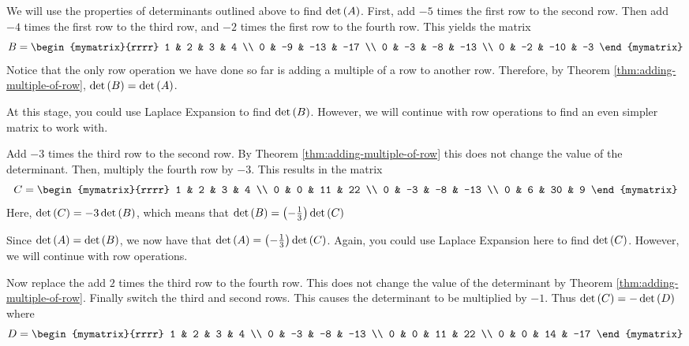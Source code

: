 \begin{solution}
We will use the properties of determinants outlined above to find $\det \left(A\right)$. First, add $-5$ times the first row to the second row. Then add $-4$ times the first row to the third row, and $-2$ times
the first row to the fourth row. This yields the matrix
\begin{equation*}
B=\begin{mymatrix}{rrrr}
1 & 2 & 3 & 4 \\
0 & -9 & -13 & -17 \\
0 & -3 & -8 & -13 \\
0 & -2 & -10 & -3
\end{mymatrix}
\end{equation*}
Notice that the only row operation we have done so far is adding a multiple 
of a row to another row. Therefore, by Theorem \ref{thm:adding-multiple-of-row}, $\det \left(B\right) = \det \left(A\right)$. 

At this stage, you could use Laplace Expansion to find $\det \left(B\right)$. However, we will continue with row operations 
to find an even simpler matrix to work with.

Add $-3$ times the third row to the second row. By Theorem \ref{thm:adding-multiple-of-row} this does not change the value of
the determinant. Then, multiply the fourth row by $-3$. This results in the matrix
\begin{equation*}
C=\begin{mymatrix}{rrrr}
1 & 2 & 3 & 4 \\
0 & 0 & 11 & 22 \\
0 & -3 & -8 & -13 \\
0 & 6 & 30 & 9
\end{mymatrix} 
\end{equation*}
Here, $\det \left(C\right) = -3 \det \left(B\right)$, which means that 
$\det \left(B\right) =\left(-\frac{1}{3}\right) \det \left(C\right) $

Since $\det \left(A\right) = \det \left(B\right)$, we now have that 
$\det \left(A\right) = \left(-\frac{1}{3}\right) \det \left(C\right)$. Again, you could use Laplace Expansion here to find $\det \left(C\right)$. However,
we will continue with row operations.

Now replace the add $2$ times the third row to the fourth row. This does not change the
value of the determinant by Theorem \ref{thm:adding-multiple-of-row}. Finally switch the third
and second rows. This causes the determinant to be multiplied by $-1$. Thus $\det \left(C\right) = -\det \left(D\right) $ where
\begin{equation*}
D=\begin{mymatrix}{rrrr}
1 & 2 & 3 & 4 \\
0 & -3 & -8 & -13 \\
0 & 0 & 11 & 22 \\
0 & 0 & 14 & -17
\end{mymatrix}
\end{equation*}


\end{solution}
